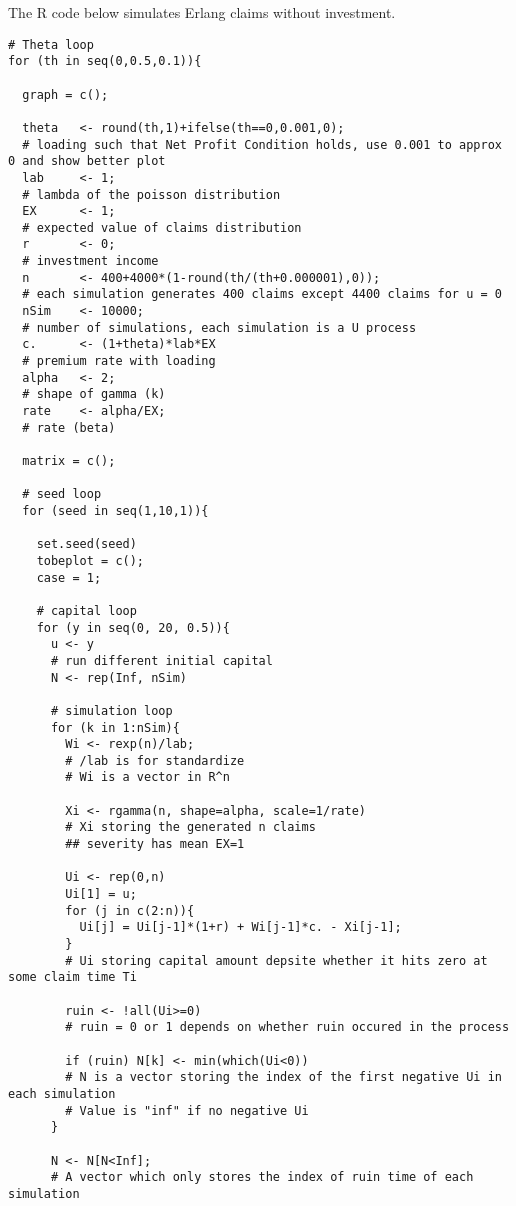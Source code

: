 \documentclass[12pt]{article}
\begin{document}
\newpage
The R code below simulates Erlang claims without investment.
\begin{lstlisting}
# Theta loop
for (th in seq(0,0.5,0.1)){
  
  graph = c();
  
  theta   <- round(th,1)+ifelse(th==0,0.001,0);
  # loading such that Net Profit Condition holds, use 0.001 to approx 0 and show better plot
  lab     <- 1;                
  # lambda of the poisson distribution
  EX      <- 1;                
  # expected value of claims distribution
  r       <- 0;                
  # investment income
  n       <- 400+4000*(1-round(th/(th+0.000001),0));
  # each simulation generates 400 claims except 4400 claims for u = 0
  nSim    <- 10000;
  # number of simulations, each simulation is a U process
  c.      <- (1+theta)*lab*EX  
  # premium rate with loading
  alpha   <- 2;                
  # shape of gamma (k)
  rate    <- alpha/EX;
  # rate (beta)
  
  matrix = c();
  
  # seed loop
  for (seed in seq(1,10,1)){
      
    set.seed(seed)
    tobeplot = c();
    case = 1;
    
    # capital loop
    for (y in seq(0, 20, 0.5)){
      u <- y                 
      # run different initial capital
      N <- rep(Inf, nSim)
      
      # simulation loop
      for (k in 1:nSim){
        Wi <- rexp(n)/lab; 
        # /lab is for standardize
        # Wi is a vector in R^n
        
        Xi <- rgamma(n, shape=alpha, scale=1/rate)
        # Xi storing the generated n claims
        ## severity has mean EX=1
        
        Ui <- rep(0,n)
        Ui[1] = u;
        for (j in c(2:n)){
          Ui[j] = Ui[j-1]*(1+r) + Wi[j-1]*c. - Xi[j-1];
        }
        # Ui storing capital amount depsite whether it hits zero at some claim time Ti
        
        ruin <- !all(Ui>=0)
        # ruin = 0 or 1 depends on whether ruin occured in the process
        
        if (ruin) N[k] <- min(which(Ui<0))
        # N is a vector storing the index of the first negative Ui in each simulation
        # Value is "inf" if no negative Ui
      }
      
      N <- N[N<Inf]; 
      # A vector which only stores the index of ruin time of each simulation 
      

\end{lstlisting}
\end{document}
